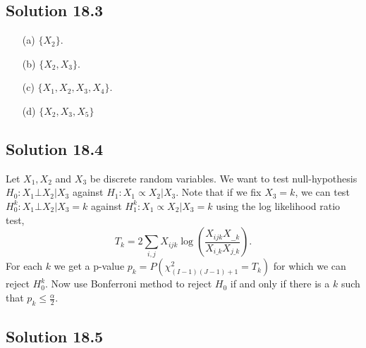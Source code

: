 \subsection*{Solution 18.3}

\begin{itemize}
    \item[(a)] $\{X_2\}$.
    \item[(b)] $\{X_2, X_3\}$.
    \item[(c)] $\{X_1, X_2, X_3, X_4\}$.
    \item[(d)] $\{X_2, X_3, X_5\}$
\end{itemize}


\subsection*{Solution 18.4}

Let $X_1, X_2$ and $X_3$ be discrete random variables.
We want to test null-hypothesis $H_0: X_1 \bot X_2 | X_3$ against $H_1: X_1 \propto X_2 | X_3$.
Note that if we fix $X_3 = k$, we can test $H_0^{k}: X_1 \bot X_2 | X_3 = k$ against $H_1^{k}: X_1 \propto X_2 | X_3 = k$ using the log likelihood ratio test,
\begin{equation*}
    T_k = 2 \sum_{i, j} X_{ijk} \log\left(\frac{X_{ijk} X_{\_\_k}}{X_{i\_k} X_{j\_k}}\right).
\end{equation*}
For each $k$ we get a p-value $p_k = P(\chi^2_{(I-1)(J-1) + 1} = T_k)$ for which we can reject $H_0^{k}$.
Now use Bonferroni method to reject $H_0$ if and only if there is a $k$ such that $p_k \leq \frac{\alpha}{2}$.


\subsection*{Solution 18.5}

